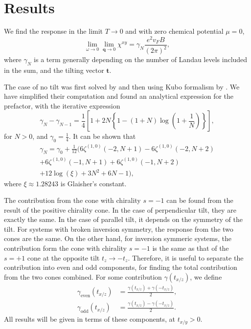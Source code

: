 \documentclass[%
 reprint,
 amsmath,amssymb,
 aps,
]{revtex4-2}
\renewcommand\vec\bm  %
\begin{document}
\section{Results\label{sec:results}}
We find the response in the limit \( T\to 0 \) and with zero chemical potential \( \mu = 0 \),
\begin{equation}
  \label{eq:response-w-dimensions}
  \lim_{\omega \to 0} \lim_{\vec{q} \to 0}
  \chi^{xy} =
  \gamma_{N} \frac{e^2 v_F B}{(2\pi)^2},
\end{equation}
where \( \gamma_N \) is a term generally depending on the number of Landau levels included in the sum, and the tilting vector \( \vec{t} \).

The case of no tilt was first solved by \textcite{chernodubGenerationNernstCurrent2018} and then using Kubo formalism by \textcite{arjonaFingerprintsConformalAnomaly2019}.
We have simplified their computation and found an analytical expression for the prefactor, with the iterative expression
\begin{equation}
  \label{eq:2}
  \gamma_{N} - \gamma_{N-1} = \frac{1}{4} \left[ 1 + 2 N \left\{ 1 - (1+N) \log \left(1 + \frac{1}{N}\right) \right\} \right],
\end{equation}
for \( N>0 \), and \( \gamma_0 = \frac{1}{4} \).
It can be shown that
\begin{multline}
  \label{eq:4}
  \gamma_N = \gamma_0 + \frac{1}{12} \Big(
    6 \zeta ^{(1,0)}(-2,N+1)
    -6 \zeta ^{(1,0)}(-2,N+2)\\
    +6 \zeta^{(1,0)}(-1,N+1)
    + 6 \zeta^{(1,0)}(-1,N+2)\\
    +12 \log (\xi)
    +3 N^2
    +6 N
    -1
  \Big),
\end{multline}
where \( \xi \approx  1.28243 \) is Glaisher's constant.


The contribution from the cone with chirality \( s = -1 \) can be found from the result of the positive chirality cone.
In the case of perpendicular tilt, they are exactly the same.
In the case of parallel tilt, it depends on the symmetry of the tilt.
For systems with broken inversion symmetry, the response from the two cones are the same.
On the other hand, for inversion symmeric systems, the contribution form the cone with chirality \( s=-1 \) is the same as that of the \( s=+1 \) cone at the opposite tilt \( t_z \to - t_z \).
Therefore, it is useful to separate the contribution into even and odd components, for finding the total contribution from the two cones combined.
For some contribution \( \gamma(t_{x /z}) \), we define
\begin{align}
  \gamma_{\text{even}}(t_{x/z}) &= \frac{\gamma(t_{x/z}) + \gamma(-t_{x/z})}{2}\label{eq:132},\\
  \gamma_{\text{odd}}(t_{x/z}) &= \frac{\gamma(t_{x/z}) - \gamma(-t_{x/z})}{2}\label{eq:133}.
\end{align}
All results will be given in terms of these components, at \( t_{x /y} > 0 \).
\end{document}
